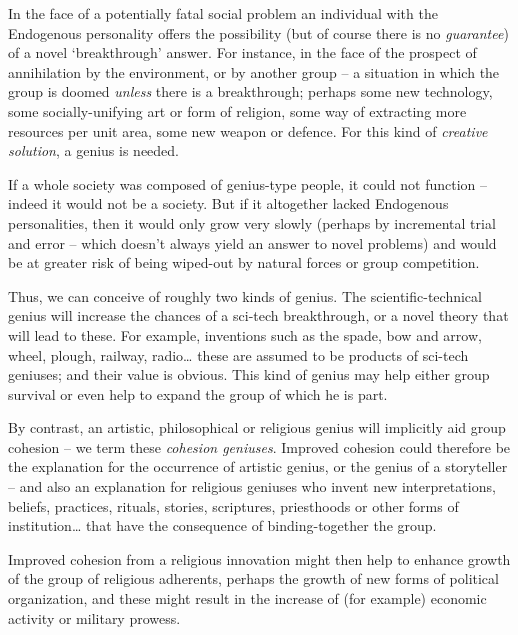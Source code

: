 \documentclass[
]{book}
\begin{document}
In the face of a potentially fatal social problem an individual with the Endogenous personality offers the possibility (but of course there is no \emph{guarantee}) of a novel `breakthrough' answer. For instance, in the face of the prospect of annihilation by the environment, or by another group -- a situation in which the group is doomed \emph{unless} there is a breakthrough; perhaps some new technology, some socially-unifying art or form of religion, some way of extracting more resources per unit area, some new weapon or defence. For this kind of \emph{creative solution}, a genius is needed.

If a whole society was composed of genius-type people, it could not function -- indeed it would not be a society. But if it altogether lacked Endogenous personalities, then it would only grow very slowly (perhaps by incremental trial and error -- which doesn't always yield an answer to novel problems) and would be at greater risk of being wiped-out by natural forces or group competition.

Thus, we can conceive of roughly two kinds of genius. The scientific-technical genius will increase the chances of a sci-tech breakthrough, or a novel theory that will lead to these. For example, inventions such as the spade, bow and arrow, wheel, plough, railway, radio\ldots{} these are assumed to be products of sci-tech geniuses; and their value is obvious. This kind of genius may help either group survival or even help to expand the group of which he is part.

By contrast, an artistic, philosophical or religious genius will implicitly aid group cohesion -- we term these \emph{cohesion geniuses}. Improved cohesion could therefore be the explanation for the occurrence of artistic genius, or the genius of a storyteller -- and also an explanation for religious geniuses who invent new interpretations, beliefs, practices, rituals, stories, scriptures, priesthoods or other forms of institution\ldots{} that have the consequence of binding-together the group.

Improved cohesion from a religious innovation might then help to enhance growth of the group of religious adherents, perhaps the growth of new forms of political organization, and these might result in the increase of (for example) economic activity or military prowess.
\end{document}
